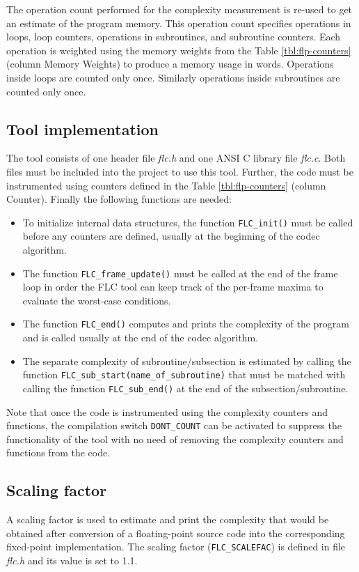 The operation count performed for the complexity measurement is re-used
to get an estimate of the program memory. This operation count specifies
operations in loops, loop counters, operations in subroutines, and
subroutine counters. Each operation is weighted using the memory weights
from the Table \ref{tbl:flp-counters} (column Memory Weights) to produce
a memory usage in words. Operations inside loops are counted only once.
Similarly operations inside subroutines are counted only once.

\subsection{Tool implementation}
The tool consists of one header file \textit{flc.h} and one ANSI C library
file \textit{flc.c}. Both files must be included into the project to use
this tool. Further, the code must be instrumented using counters defined
in the Table \ref{tbl:flp-counters} (column Counter). Finally the following
functions are needed:
\begin{itemize}
\item To initialize internal data structures, the function
{\tt FLC\_init()} must be called before any counters are defined,
usually at the beginning of the codec algorithm.
\item The function {\tt FLC\_frame\_update()} must be called at the
end of the frame loop in order the FLC tool can keep track of the
per-frame maxima to evaluate the worst-case conditions.
\item The function {\tt FLC\_end()} computes and prints the complexity
of the program and is called usually at the end of the codec algorithm.
\item The separate complexity of subroutine/subsection is estimated by
calling the function {\tt FLC\_sub\_start(name\_of\_subroutine)} that
must be matched with calling the function {\tt FLC\_sub\_end()} at
the end of the subsection/subroutine.
\end{itemize}

Note that once the code is instrumented using the complexity counters
and functions, the compilation switch {\tt DONT\_COUNT} can be
activated to suppress the functionality of the tool with no need of
removing the complexity counters and functions from the code.

\subsection{Scaling factor}
A scaling factor is used to estimate and print the complexity that
would be obtained after conversion of a floating-point source code
into the corresponding fixed-point implementation. The scaling factor
({\tt FLC\_SCALEFAC}) is defined in file \textit{flc.h} and its value
is set to 1.1.

